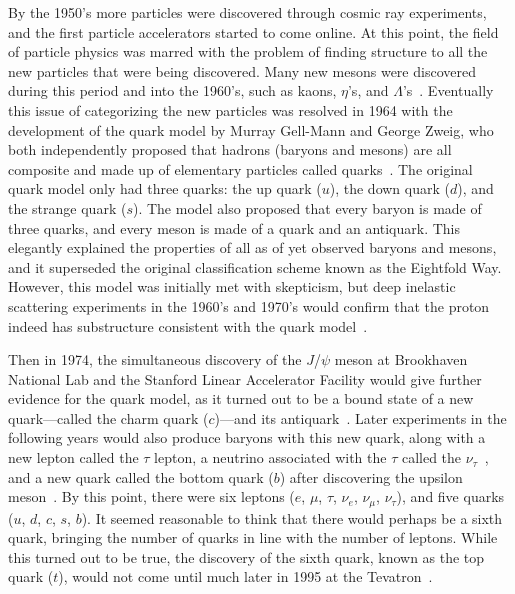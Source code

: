 By the 1950's more particles were discovered through cosmic ray experiments, and the first particle accelerators started to come online.
At this point, the field of particle physics was marred with the problem of finding structure to all the new particles that were being discovered.
Many new mesons were discovered during this period and into the 1960's, such as kaons, $\eta$'s, and $\Lambda$'s~\cite{CosmicRay,PhysRevLett.7.421}.
Eventually this issue of categorizing the new particles was resolved in 1964 with the development of the quark model by Murray Gell-Mann and George Zweig, who both independently proposed that hadrons (baryons and mesons) are all composite and made up of elementary particles called quarks~\cite{Gellmann1964214,Zweig:1964jf}.
The original quark model only had three quarks: the up quark ($u$), the down quark ($d$), and the strange quark ($s$).
The model also proposed that every baryon is made of three quarks, and every meson is made of a quark and an antiquark.
This elegantly explained the properties of all as of yet observed baryons and mesons, and it superseded the original classification scheme known as the Eightfold Way.
However, this model was initially met with skepticism, but deep inelastic scattering experiments in the 1960's and 1970's would confirm that the proton indeed has substructure consistent with the quark model~\cite{PhysRevLett.23.930,cernQuarks}.

Then in 1974, the simultaneous discovery of the $J$/$\psi$ meson at Brookhaven National Lab and the Stanford Linear Accelerator Facility would give further evidence for the quark model, as it turned out to be a bound state of a new quark---called the charm quark ($c$)---and its antiquark~\cite{PhysRevLett.33.1406,PhysRevLett.33.1404}.
Later experiments in the following years would also produce baryons with this new quark, along with a new lepton called the $\tau$ lepton, a neutrino associated with the $\tau$ called the $\nu_\tau$~\cite{Perl:1976rz}, and a new quark called the bottom quark ($b$) after discovering the upsilon meson~\cite{1977PhRvL..39..252H}.
By this point, there were six leptons ($e$, $\mu$, $\tau$, $\nu_e$, $\nu_\mu$, $\nu_\tau$), and five quarks ($u$, $d$, $c$, $s$, $b$).
It seemed reasonable to think that there would perhaps be a sixth quark, bringing the number of quarks in line with the number of leptons.
While this turned out to be true, the discovery of the sixth quark, known as the top quark ($t$), would not come until much later in 1995 at the Tevatron~\cite{PhysRevLett.74.2626}.

